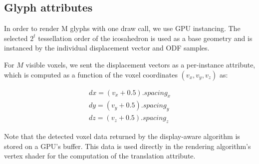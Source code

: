 \documentclass[twoside,twocolumn,10pt]{article}
\begin{document}
\subsection{Glyph attributes}
\label{ssec::glyph_attributes}

In order to render M glyphs with one draw call, we use GPU instancing. The selected $2^t$ tessellation order of the icosahedron is used as a base geometry and is instanced by the individual displacement vector and ODF samples.

For $M$ visible voxels, we sent the displacement vectors as a per-instance attribute, which is computed as a function of the voxel coordinates $(v_x, v_y, v_z)$ as:

\begin{align}
 \label{eq::translation}
    dx = (v_x + 0.5).spacing_x \nonumber\\
    dy = (v_y + 0.5).spacing_y \\
    dz = (v_z + 0.5).spacing_z \nonumber
\end{align}



Note that the detected voxel data returned by the display-aware algorithm is stored on a GPU's buffer. This data is used directly in the rendering algorithm's vertex shader for the computation of the translation attribute.







\end{document}
